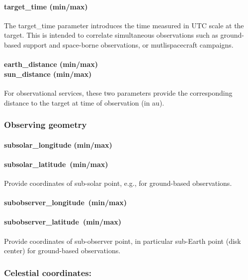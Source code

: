 \documentclass[11pt,a4paper]{ivoa}
\begin{document}
\paragraph{target\_time (min/max)}

The target\_time parameter introduces the time measured in UTC scale at the target. This is intended to correlate simultaneous observations such as ground-based support and space-borne observations, or mutlispacecraft campaigns.

\paragraph{earth\_distance (min/max)\\sun\_distance (min/max)}

For observational services, these two parameters provide the corresponding distance to the target at time of observation (in au).

\subsubsection{Observing geometry}

\paragraph{\textbf{subsolar\_longitude (min/max)}}

\paragraph{\textbf{subsolar\_latitude }\textbf{(min/max)}}

Provide coordinates of sub-solar point, e.g., for ground-based observations.

\paragraph{\textbf{subobserver\_longitude }\textbf{(min/max)}}

\paragraph{\textbf{subobserver\_latitude }\textbf{(min/max)}}

Provide coordinates of sub-observer point, in particular sub-Earth point (disk center) for ground-based observations.

\subsubsection{Celestial coordinates:}
\end{document}
